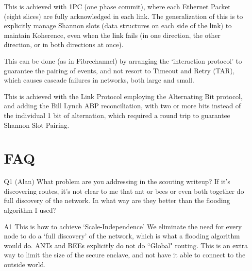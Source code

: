\documentclass[../OAE-SPEC-MAIN.tex]{subfiles}
\begin{document}
This is achieved with 1PC (one phase commit), where each Ethernet Packet (eight slices) are fully acknowledged in each link. The generalization of this is to explicitly manage Shannon slots (data structures on each side of the link) to maintain Koherence, even when the link fails (in one direction, the other direction, or in both directions at once).

This can be done (as in Fibrechannel)  by arranging the `interaction protocol' to guarantee the pairing of events, and not resort to Timeout and Retry (TAR), which causes cascade failures in networks, both large and small.

This is achieved with the Link Protocol employing the Alternating Bit protocol, and adding the Bill Lynch ABP reconciliation, with two or more bits instead of the individual 1 bit of alternation, which required a round trip to guarantee Shannon Slot Pairing.


\section{FAQ}

Q1 (Alan) What problem are you addressing in the scouting writeup?  If it’s discovering routes, it’s not clear to me that ant or bees or even both together do full discovery of the network.  In what way are they better than the flooding algorithm I used?

A1 This is how to achieve `Scale-Independence' We eliminate the need for   every node  to do a `full discovery' of the network, which is what a flooding algorithm would do.  ANTs and BEEs explicitly do not do ``Global" routing. This is an extra way to limit the size of the secure enclave, and not have it able to connect to the outside world.  
\end{document}
